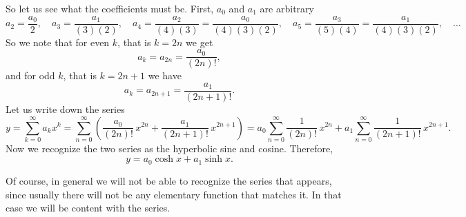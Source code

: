 \documentclass[12pt]{book}
\begin{document}
\begin{example}
So let us see what the coefficients
must be.  First, $a_0$ and $a_1$ are arbitrary
\begin{equation*}
a_2 = \frac{a_0}{2}, \quad
a_3 = \frac{a_1}{(3)(2)}, \quad
a_4 = \frac{a_2}{(4)(3)} = \frac{a_0}{(4)(3)(2)}, \quad
a_5 = \frac{a_3}{(5)(4)} = \frac{a_1}{(4)(3)(2)}, \quad \ldots
\end{equation*}
So we note that for even $k$, that is $k=2n$
we get
\begin{equation}
a_k = a_{2n} = \frac{a_0}{(2n)!} ,
\end{equation}
and for odd $k$, that is $k=2n+1$ we have
\begin{equation}
a_k = a_{2n+1} = \frac{a_1}{(2n+1)!} .
\end{equation}
Let us write down the series
\begin{equation*}
y =
\sum_{k=0}^\infty
a_k x^k
=
\sum_{n=0}^\infty
\left(
\frac{a_0}{(2n)!} \,x^{2n}
+
\frac{a_1}{(2n+1)!} \,x^{2n+1}
\right)
=
a_0
\sum_{n=0}^\infty
\frac{1}{(2n)!} \,x^{2n}
+
a_1
\sum_{n=0}^\infty
\frac{1}{(2n+1)!} \,x^{2n+1} .
\end{equation*}
Now we recognize the two series as the hyperbolic sine and cosine.
Therefore,
\begin{equation*}
y =
a_0 \cosh x + a_1 \sinh x .
\end{equation*}
\end{example}

Of course, in general we will not be able to recognize 
the series that appears, since usually there will not be
any elementary function that matches it.  In that case we will be
content with the series.
\end{document}
